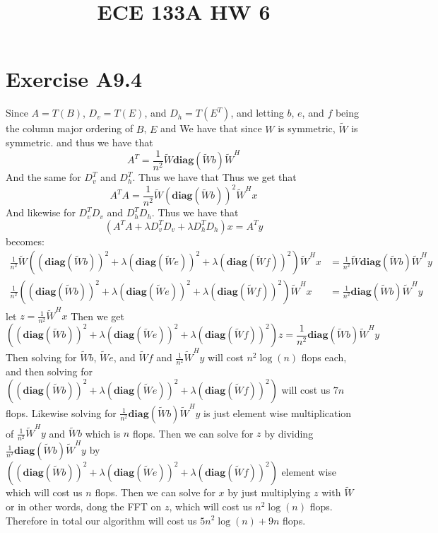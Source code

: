 
\title{ECE 133A HW 6}

\maketitle
\section*{Exercise A9.4}
Since $A=T(B)$, $D_v=T(E)$, and $D_h=T(E^T)$, and letting
$b$, $e$, and $f$ being the column major ordering of $B$, $E$ and  
We have that since $W$ is symmetric, $\tilde{W}$ is symmetric. and thus we have that 
$$A^T=\frac{1}{n^2}\tilde{W}\textbf{diag}(\tilde{W}b)\tilde{W}^H$$
And the same for $D_v^T$ and $D_h^T$. Thus we have that
Thus we get that 
$$A^TA=\frac{1}{n^2}\tilde{W}\left(\textbf{diag}(\tilde{W}b)\right)^2\tilde{W}^Hx$$
And likewise for $D_v^TD_v$ and $D_h^TD_h$. Thus we have that
$$(A^TA+\lambda D^T_vD_v+\lambda D^T_hD_h)x=A^Ty$$
becomes:
\begin{align*}
    \frac{1}{n^2}\tilde{W}\left(\left(\textbf{diag}(\tilde{W}b)\right)^2 +\lambda \left(\textbf{diag}(\tilde{W}e)\right)^2 
            +\lambda \left(\textbf{diag}(\tilde{W}f)\right)^2\right)\tilde{W}^Hx
            &=\frac{1}{n^2}\tilde{W}\textbf{diag}(\tilde{W}b)\tilde{W}^Hy\\
            \frac{1}{n^2}\left(\left(\textbf{diag}(\tilde{W}b)\right)^2 +\lambda \left(\textbf{diag}(\tilde{W}e)\right)^2 
            +\lambda \left(\textbf{diag}(\tilde{W}f)\right)^2\right)\tilde{W}^Hx
            &=\frac{1}{n^2}\textbf{diag}(\tilde{W}b)\tilde{W}^Hy
\end{align*}
let $z=\frac{1}{n^2}\tilde{W}^Hx$ Then we get
$$\left(\left(\textbf{diag}(\tilde{W}b)\right)^2 +\lambda \left(\textbf{diag}(\tilde{W}e)\right)^2 
            +\lambda \left(\textbf{diag}(\tilde{W}f)\right)^2\right)z
            =\frac{1}{n^2}\textbf{diag}(\tilde{W}b)\tilde{W}^Hy$$
Then solving for $\tilde{W}b$, $\tilde{W}e$, and $\tilde{W}f$ and $\frac{1}{n^2}\tilde{W}^Hy$ 
will cost $n^2\log(n)$ flops each, and then solving for 
$\left(\left(\textbf{diag}(\tilde{W}b)\right)^2 +\lambda \left(\textbf{diag}(\tilde{W}e)\right)^2 
+\lambda \left(\textbf{diag}(\tilde{W}f)\right)^2\right)$ will cost 
us $7n$ flops. Likewise solving for $\frac{1}{n^2}\textbf{diag}(\tilde{W}b)\tilde{W}^Hy$
is just element wise multiplication of $\frac{1}{n^2}\tilde{W}^Hy$ and 
$\tilde{W}b$ which is $n$ flops. Then we can solve for 
$z$ by dividing $\frac{1}{n^2}\textbf{diag}(\tilde{W}b)\tilde{W}^Hy$
by $\left(\left(\textbf{diag}(\tilde{W}b)\right)^2 +\lambda \left(\textbf{diag}(\tilde{W}e)\right)^2
+\lambda \left(\textbf{diag}(\tilde{W}f)\right)^2\right)$
element wise which will cost us $n$ flops. Then we can solve for $x$ by 
just multiplying $z$ with $\tilde{W}$ 
or in other words, dong the FFT on $z$, which will cost us $n^2\log(n)$ flops. 
Therefore in total our algorithm will cost us 
$5n^2\log(n)+9n$ flops.

